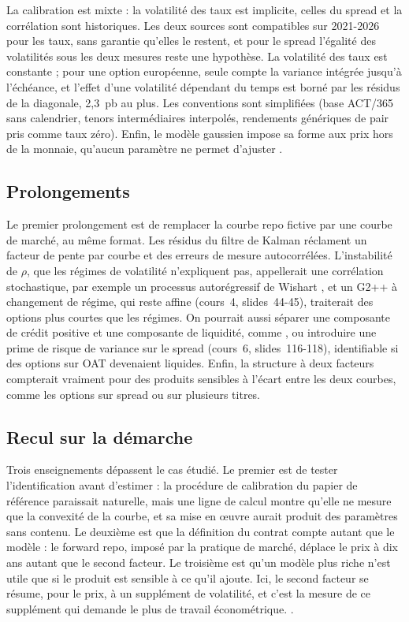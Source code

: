 La calibration est mixte : la volatilité des taux est implicite, celles du spread et la corrélation sont
historiques. Les deux sources sont compatibles sur 2021-2026 pour les taux, sans garantie qu'elles le restent, et
pour le spread l'égalité des volatilités sous les deux mesures reste une hypothèse. La volatilité des taux est
constante ; pour une option européenne, seule compte la variance intégrée jusqu'à l'échéance, et l'effet d'une
volatilité dépendant du temps est borné par les résidus de la diagonale, 2,3~pb au plus. Les conventions sont
simplifiées (base ACT/365 sans calendrier, tenors intermédiaires interpolés, rendements génériques de pair pris
comme taux zéro). Enfin, le modèle gaussien impose sa forme aux prix hors de la monnaie, qu'aucun paramètre ne
permet d'ajuster \citep[section~6.3.5]{Chaix2021}.

\subsection*{Prolongements}

Le premier prolongement est de remplacer la courbe repo fictive par une courbe de marché, au même format. Les
résidus du filtre de Kalman réclament un facteur de pente par courbe et des erreurs de mesure autocorrélées.
L'instabilité de $\rho$, que les régimes de volatilité n'expliquent pas, appellerait une corrélation stochastique,
par exemple un processus autorégressif de Wishart \citep[cours~4, slides~115-118]{MPR2025}, et un G2++ à
changement de régime, qui reste affine (cours~4, slides~44-45), traiterait des options plus courtes que les
régimes. On pourrait aussi séparer une composante de crédit positive et une composante de liquidité, comme
\citet{MonfortRenne2014}, ou introduire une prime de risque de variance sur le spread (cours~6, slides~116-118),
identifiable si des options sur OAT devenaient liquides. Enfin, la structure à deux facteurs compterait vraiment
pour des produits sensibles à l'écart entre les deux courbes, comme les options sur spread ou sur plusieurs titres.

\subsection*{Recul sur la démarche}

Trois enseignements dépassent le cas étudié. Le premier est de tester l'identification avant d'estimer : la
procédure de calibration du papier de référence paraissait naturelle, mais une ligne de calcul montre qu'elle ne
mesure que la convexité de la courbe, et sa mise en œuvre aurait produit des paramètres sans contenu. Le deuxième
est que la définition du contrat compte autant que le modèle : le forward repo, imposé par la pratique de marché,
déplace le prix à dix ans autant que le second facteur. Le troisième est qu'un modèle plus riche n'est utile que
si le produit est sensible à ce qu'il ajoute. Ici, le second facteur se résume, pour le prix, à un supplément de
volatilité, et c'est la mesure de ce supplément qui demande le plus de travail économétrique.
.
